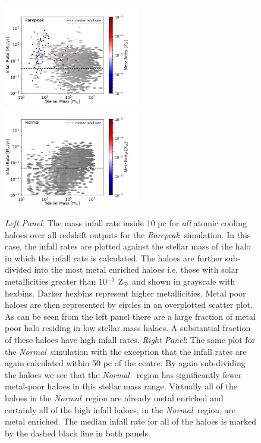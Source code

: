 \documentclass[graphics, twocolumn, usenatbib]{mn2e}
\newcommand{\zsolar} {$\rm{Z_{\odot}}~$}
\newcommand{\rarepeak} {\textit{Rarepeak~}}
\newcommand{\normal} {\textit{Normal~}}
\begin{document}
\begin{figure}
\centering
\begin{minipage}{175mm}      \begin{center} 
\centerline{
\includegraphics[width=0.525\textwidth]{FIGURES/Rarepeak_MdotMstellarZ_Hexbin.png}
\includegraphics[width=0.525\textwidth]{FIGURES/Normal_MdotMstellarZ_Hexbin.png}}
\caption{\textit{Left Panel}: The mass infall rate inside 10 pc for \textit{all} atomic
  cooling haloes over all redshift outputs for the \rarepeak simulation. In this case,
  the infall rates are plotted against the stellar mass of the halo in which the infall rate is
  calculated. The haloes are further sub-divided into the most metal enriched haloes
  i.e. those with solar metallicities greater than 10$^{-3}$ \zsolar and shown in grayscale with hexbins.
  Darker hexbins represent higher metallicities. Metal poor haloes are then represented by circles in
  an overplotted scatter plot. As can be seen from the left panel there are a large fraction of
  metal poor halo residing in low stellar mass haloes. A substantial fraction of these haloes have
  high infall rates. 
  \textit{Right Panel}: The same plot for the \normal simulation with the exception that the infall rates are 
  again calculated within 50 pc of the centre. By again sub-dividing the haloes we see that the \normal
  region has significantly fewer metal-poor haloes in this stellar mass range. Virtually all of the
  haloes in the \normal region are already metal enriched and certainly all of the high infall haloes,
  in the \normal region, are metal enriched. 
  The median infall rate for all of the haloes is marked by the dashed black line in both panels.} \label{Fig:StellarMass}
\end{center} \end{minipage}

\end{figure}
\end{document}
